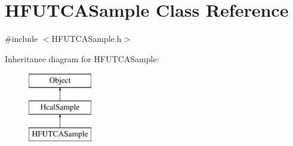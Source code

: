\hypertarget{class_h_f_u_t_c_a_sample}{}\section{H\+F\+U\+T\+C\+A\+Sample Class Reference}
\label{class_h_f_u_t_c_a_sample}


{\ttfamily \#include $<$H\+F\+U\+T\+C\+A\+Sample.\+h$>$}

Inheritance diagram for H\+F\+U\+T\+C\+A\+Sample\+:\begin{figure}[H]
\begin{center}
\leavevmode
\includegraphics[height=3.000000cm]{class_h_f_u_t_c_a_sample}
\end{center}
\end{figure}
